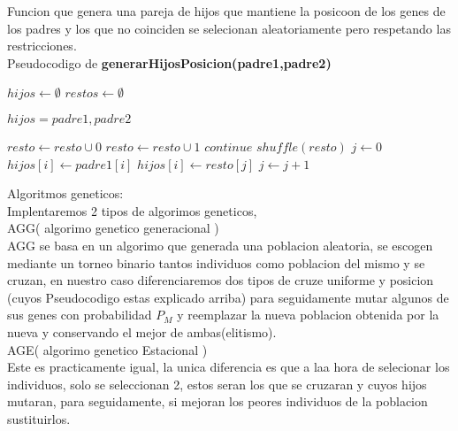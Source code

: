 Funcion que genera una pareja de hijos que mantiene la posicoon de los genes de los padres y los que no coinciden
se selecionan aleatoriamente pero respetando las restricciones.\\
Pseudocodigo de \textbf{generarHijosPosicion(padre1,padre2)}
\begin{algorithm}[H]
  \begin{algorithmic}[1]
      \State $hijos \gets \emptyset$
      \State $restos \gets \emptyset$

        \State $hijos = padre1,padre2$  
      \EndIf

            \State $resto \gets resto \cup 0$
            \State $resto \gets resto \cup 1$
          \EndIf
        \Else
          \State$continue$
        \EndIf
      \EndFor
      \State $shuffle(resto)$
      \State $j \gets 0$
            \State $hijos[i] \gets padre1[i] $
        \Else
            \State $hijos[i] \gets resto[j] $
            \State $j \gets j +1$
        \EndIf
      \EndFor

      \State {}
    \EndFunction
  \end{algorithmic}
\end{algorithm}


Algoritmos geneticos:\\
Implentaremos 2 tipos de algorimos geneticos,\\
AGG( algorimo genetico generacional )\\
AGG se basa en un algorimo que generada una poblacion aleatoria, se escogen mediante un torneo binario tantos individuos como
poblacion del mismo y se cruzan, en nuestro caso diferenciaremos dos tipos de cruze uniforme y posicion (cuyos Pseudocodigo estas explicado arriba)
para seguidamente mutar algunos de sus genes con probabilidad $P_M$ y reemplazar la nueva poblacion obtenida por la nueva y conservando el mejor de ambas(elitismo).\\
AGE( algorimo genetico Estacional )\\  
Este es practicamente igual, la unica diferencia es que a laa hora de selecionar los individuos, solo se seleccionan 2, estos seran los que se cruzaran y cuyos hijos mutaran, 
para seguidamente, si mejoran los peores individuos de la poblacion sustituirlos.


